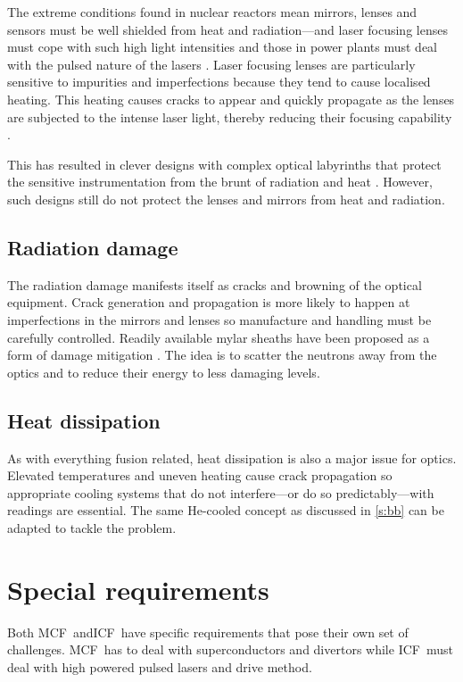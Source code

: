 \documentclass[12pt, a4paper]{article}
\newcommand{\mc}{MCF}
\newcommand{\ic}{ICF}
\begin{document}
		The extreme conditions found in nuclear reactors mean mirrors, lenses and sensors must be well shielded from heat and radiation---and laser focusing lenses must cope with such high light intensities and those in power plants must deal with the pulsed nature of the lasers \cite{lens1}. Laser focusing lenses are particularly sensitive to impurities and imperfections because they tend to cause localised heating. This heating causes cracks to appear and quickly propagate as the lenses are subjected to the intense laser light, thereby reducing their focusing capability \cite{lens2}.
		
		This has resulted in clever designs with complex optical labyrinths that protect the sensitive instrumentation from the brunt of radiation and heat \cite{optic1}. However, such designs still do not protect the lenses and mirrors from heat and radiation.
		\subsection{Radiation damage}
			The radiation damage manifests itself as cracks and browning of the optical equipment. Crack generation and propagation is more likely to happen at imperfections in the mirrors and lenses so manufacture and handling must be carefully controlled. Readily available mylar sheaths have been proposed as a form of damage mitigation \cite{mylar}. The idea is to scatter the neutrons away from the optics and to reduce their energy to less damaging levels.
		\subsection{Heat dissipation}
			As with everything fusion related, heat dissipation is also a major issue for optics. Elevated temperatures and uneven heating cause crack propagation so appropriate cooling systems that do not interfere---or do so predictably---with readings are essential. The same He-cooled concept as discussed in \cref{s:bb} can be adapted to tackle the problem.
	\section{Special requirements}\label{s:sr}
		Both \mc~and\ic~have specific requirements that pose their own set of challenges. \mc~has to deal with superconductors and divertors while \ic~must deal with high powered pulsed lasers and drive method.
\end{document}
